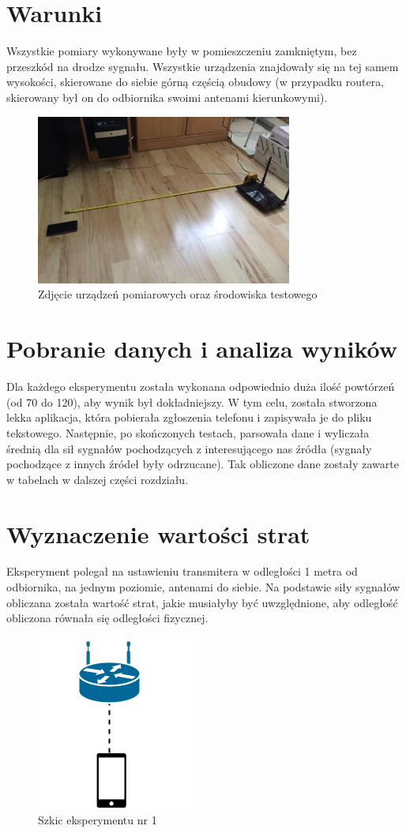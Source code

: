 \section{Warunki}
Wszystkie pomiary wykonywane były w pomieszczeniu zamkniętym, bez przeszkód na drodze sygnału. Wszystkie urządzenia znajdowały się na tej samem wysokości, skierowane do siebie górną częścią obudowy (w przypadku routera, skierowany był on do odbiornika swoimi antenami kierunkowymi).
\begin{figure}[H]
	\centering			
	\caption{Zdjęcie urządzeń pomiarowych oraz środowiska testowego}
	\includegraphics[width=0.75\textwidth]{srodowisko_pomiarowe}
\end{figure}
\section{Pobranie danych i analiza wyników}
Dla każdego eksperymentu została wykonana odpowiednio duża ilość powtórzeń (od 70 do 120), aby wynik był dokładniejszy. W tym celu, została stworzona lekka aplikacja, która pobierała zgłoszenia telefonu i zapisywała je do pliku tekstowego. Następnie, po skończonych testach, parsowała dane i wyliczała średnią dla sił sygnałów pochodzących z interesującego nas źródła (sygnały pochodzące z innych źródeł były odrzucane). Tak obliczone dane zostały zawarte w tabelach w dalszej części rozdziału.
\section{Wyznaczenie wartości strat}
Eksperyment polegał na ustawieniu transmitera w odległości 1 metra od odbiornika, na jednym poziomie, antenami do siebie. Na podstawie siły sygnałów obliczana została wartość strat, jakie musiałyby być uwzględnione, aby odległość obliczona równała się odległości fizycznej.\\			
\begin{figure}[H]
	\centering			
	\caption{Szkic eksperymentu nr 1}
	\includegraphics{exper1}
\end{figure}
